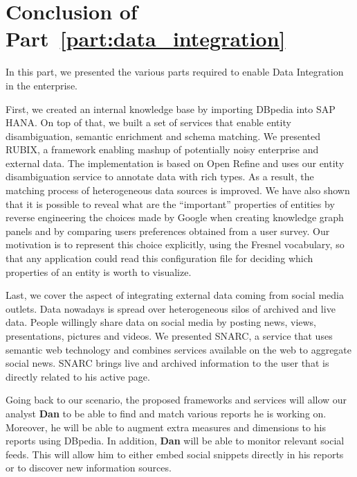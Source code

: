 \chapter*{Conclusion of Part~\ref{part:data_integration}}

In this part, we presented the various parts required to enable Data Integration in the enterprise.

First, we created an internal knowledge base by importing DBpedia into SAP HANA. On top of that, we built a set of services that enable entity disambiguation, semantic enrichment and schema matching. We presented RUBIX, a framework enabling mashup of potentially noisy enterprise and external data. The implementation is based on Open Refine and uses our entity disambiguation service to annotate data with rich types. As a result, the matching process of heterogeneous data sources is improved. We have also shown that it is possible to reveal what are the ``important'' properties of entities by reverse engineering the choices made by Google when creating knowledge graph panels and by comparing  users preferences obtained from a user survey. Our motivation is to represent this choice explicitly, using the Fresnel vocabulary, so that any application could read this configuration file for deciding which properties of an entity is worth to visualize.

Last, we cover the aspect of integrating external data coming from social media outlets. Data nowadays is spread over heterogeneous silos of archived and live data. People willingly share data on social media by posting news, views, presentations, pictures and videos. We presented SNARC, a service that uses semantic web technology and combines services available on the web to aggregate social news. SNARC brings live and archived information to the user that is directly related to his active page.

Going back to our scenario, the proposed frameworks and services will allow our analyst \textbf{Dan} to be able to find and match various reports he is working on. Moreover, he will be able to augment extra measures and dimensions to his reports using DBpedia. In addition, \textbf{Dan} will be able to monitor relevant social feeds. This will allow him to either embed social snippets directly in his reports or to discover new information sources.